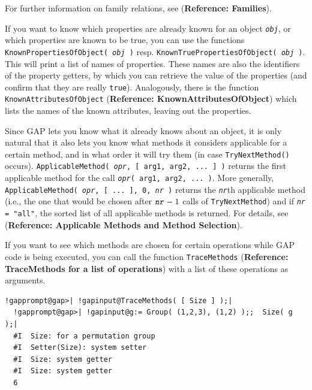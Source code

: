 \documentclass[a4paper,11pt]{report}
\begin{document}
{{ For further information on family relations, see  (\textbf{Reference: Families}). 

    If you want to know which properties are already known for an object \mbox{\texttt{\mdseries\slshape obj}}, or which properties are known to be true, you can use the functions \texttt{KnownPropertiesOfObject( \mbox{\texttt{\mdseries\slshape obj}} )} resp. \texttt{KnownTruePropertiesOfObject( \mbox{\texttt{\mdseries\slshape obj}} )}. This will print a list of names of properties. These names are also the
identifiers of the property getters, by which you can retrieve the value of
the properties (and confirm that they are really \texttt{true}). Analogously, there is the function \texttt{KnownAttributesOfObject} (\textbf{Reference: KnownAttributesOfObject}) which lists the names of the known attributes, leaving out the properties. 

  Since \textsf{GAP} lets you know what it already knows about an object, it is only natural that
it also lets you know what methods it considers applicable for a certain
method, and in what order it will try them (in case \texttt{TryNextMethod()} occurs). \texttt{ApplicableMethod( \mbox{\texttt{\mdseries\slshape opr}}, [ arg{\textunderscore}1, arg{\textunderscore}2, ... ] )} returns the first applicable method for the call \texttt{\mbox{\texttt{\mdseries\slshape opr}}( arg{\textunderscore}1, arg{\textunderscore}2, ... )}. More generally, \texttt{ApplicableMethod( \mbox{\texttt{\mdseries\slshape opr}}, [ ... ], 0, \mbox{\texttt{\mdseries\slshape nr}} )} returns the \mbox{\texttt{\mdseries\slshape nr}}th applicable method (i.e., the one that would be chosen after $\mbox{\texttt{\mdseries\slshape nr}}-1$ calls of \texttt{TryNextMethod}) and if \mbox{\texttt{\mdseries\slshape nr}}\texttt{ = "all"}, the sorted list of all applicable methods is returned. For details, see  (\textbf{Reference: Applicable Methods and Method Selection}). 

  If you want to see which methods are chosen for certain operations while \textsf{GAP} code is being executed, you can call the function \texttt{TraceMethods} (\textbf{Reference: TraceMethods for a list of operations}) with a list of these operations as arguments. 

 
\begin{Verbatim}[commandchars=!@|,fontsize=\small,frame=single,label=Example]
  !gapprompt@gap>| !gapinput@TraceMethods( [ Size ] );|
  !gapprompt@gap>| !gapinput@g:= Group( (1,2,3), (1,2) );;  Size( g );|
  #I  Size: for a permutation group
  #I  Setter(Size): system setter
  #I  Size: system getter
  #I  Size: system getter
  6
\end{Verbatim}
 

}}
\end{document}
